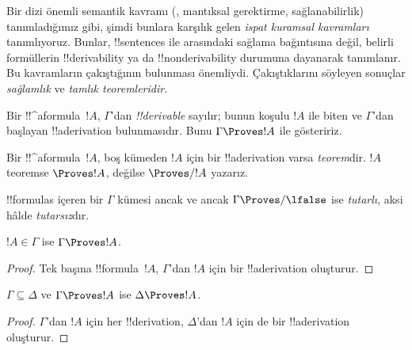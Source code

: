\documentclass[../../../include/open-logic-section]{subfiles}
\begin{document}
      {}
      {}


\begin{explain}
Bir dizi önemli semantik kavramı
(, mantıksal gerektirme, sağlanabilirlik)
tanımladığımız gibi, şimdi bunlara karşılık gelen \emph{ispat kuramsal
kavramları} tanımlıyoruz. Bunlar, !!{sentence}s ile
 arasındaki sağlama bağıntısına değil,
belirli formüllerin !!{derivability} ya da
!!{nonderivability} durumuna dayanarak tanımlanır. Bu kavramların çakıştığının bulunması
önemliydi. Çakıştıklarını söyleyen sonuçlar \emph{sağlamlık} ve
\emph{tamlık teoremleridir}.
\end{explain}

\begin{defn}[!!^{derivability}]
Bir !!^a{formula}~$!A$, $\Gamma$'dan \emph{!!{derivable}} sayılır; bunun
koşulu $!A$ ile biten ve $\Gamma$'dan başlayan !!a{derivation} bulunmasıdır.
Bunu $\Gamma \Proves !A$ ile gösteririz.
\end{defn}

\begin{defn}[Teoremler]
Bir !!^a{formula}~$!A$, boş kümeden $!A$ için bir !!a{derivation} varsa
\emph{teorem}dir. $!A$ teoremse $\Proves !A$, değilse $\Proves/ !A$ yazarız.
\end{defn}

\begin{defn}[Tutarlılık]
!!{formula}s içeren bir $\Gamma$ kümesi ancak ve ancak
$\Gamma\Proves/ \lfalse$ ise \emph{tutarlı}, aksi hâlde \emph{tutarsız}dır.
\end{defn}

\begin{prop}[Yansımalılık]
$!A \in \Gamma$ ise $\Gamma \Proves !A$.
\end{prop}

\begin{proof}
  Tek başına !!{formula}~$!A$, $\Gamma$'dan $!A$ için bir
  !!a{derivation} oluşturur.
\end{proof}

\begin{prop}[Monotonluk]
$\Gamma \subseteq \Delta$ ve $\Gamma \Proves !A$ ise $\Delta \Proves !A$.
\end{prop}

\begin{proof}
$\Gamma$'dan $!A$ için her !!{derivation}, $\Delta$'dan $!A$ için de bir
!!a{derivation} oluşturur.
\end{proof}
\end{document}

